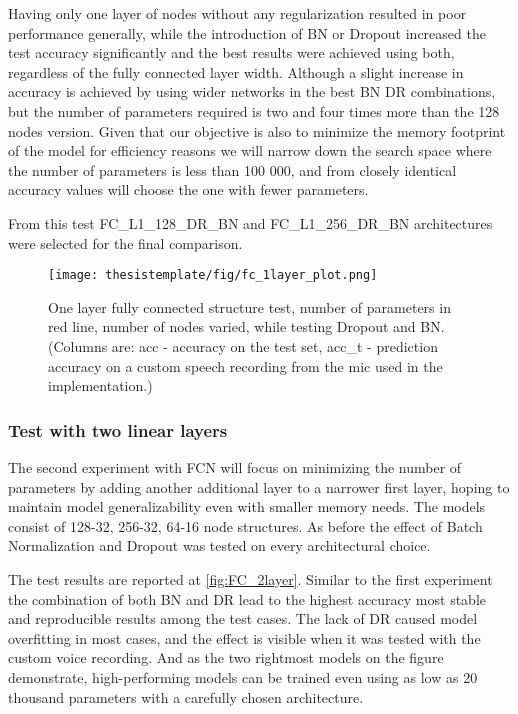 Having only one layer of nodes without any regularization resulted in poor performance generally, while the introduction of BN or Dropout increased the test accuracy significantly and the best results were achieved using both, regardless of the fully connected layer width. Although a slight increase in accuracy is achieved by using wider networks in the best BN DR combinations, but the number of parameters required is two and four times more than the 128 nodes version. Given that our objective is also to minimize the memory footprint of the model for efficiency reasons we will narrow down the search space where the number of parameters is less than 100 000, and from closely identical accuracy values will choose the one with fewer parameters.


From this test FC\_L1\_128\_DR\_BN and FC\_L1\_256\_DR\_BN architectures were selected for the final comparison.
\begin{figure}[ht!]
  \begin{center}
    \texttt{[image: thesistemplate/fig/fc\_1layer\_plot.png]}
    \caption{One layer fully connected structure test, number of parameters in red line, number of nodes varied, while testing Dropout and BN. (Columns are: acc - accuracy on the test set, acc\_t - prediction accuracy on a custom speech recording from the mic used in the implementation.) }
    \label{fig:FC_1layer}
  \end{center}
\end{figure}

\subsubsection{Test with two linear layers}

The second experiment with FCN will focus on minimizing the number of parameters by adding another additional layer to a narrower first layer, hoping to maintain model generalizability even with smaller memory needs. The models consist of 128-32, 256-32, 64-16 node structures. As before the effect of Batch Normalization and Dropout was tested on every architectural choice.

The test results are reported at \autoref{fig:FC_2layer}. Similar to the first experiment the combination of both BN and DR lead to the highest accuracy most stable and reproducible results among the test cases. The lack of DR caused model overfitting in most cases, and the effect is visible when it was tested with the custom voice recording. And as the two rightmost models on the figure demonstrate, high-performing models can be trained even using as low as 20 thousand parameters with a carefully chosen architecture.

